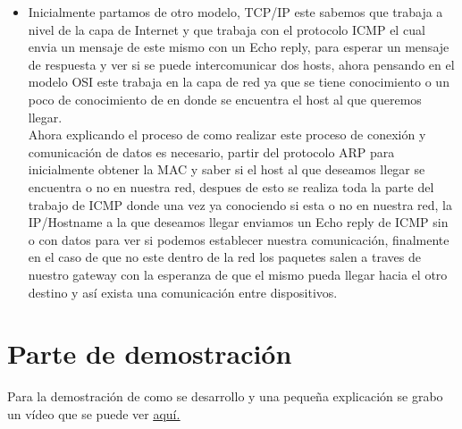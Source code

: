 \documentclass[10pt]{article}
\begin{document}
\begin{itemize}
  \item Inicialmente partamos de otro modelo, TCP/IP este sabemos que trabaja a nivel de la capa de Internet y que trabaja con el protocolo ICMP el cual envia un mensaje de este mismo con un Echo reply, para esperar un mensaje de respuesta y ver si se puede intercomunicar dos hosts, ahora pensando en el modelo OSI este trabaja en la capa de red ya que se tiene conocimiento o un poco de conocimiento de en donde se encuentra el host al que queremos llegar.\\
  Ahora explicando el proceso de como realizar este proceso de conexión y comunicación de datos es necesario, partir del protocolo ARP para inicialmente obtener la MAC y saber si el host al que deseamos llegar se encuentra o no en nuestra red, despues de esto se realiza toda la parte del trabajo de ICMP donde una vez ya conociendo si esta o no en nuestra red, la IP/Hostname a la que deseamos llegar enviamos un Echo reply de ICMP sin o con datos para ver si podemos establecer nuestra comunicación, finalmente en el caso de que no este dentro de la red los paquetes salen a traves de nuestro gateway con la esperanza de que el mismo pueda llegar hacia el otro destino y así exista una comunicación entre dispositivos.
\end{itemize}
\section{Parte de demostración}
Para la demostración de como se desarrollo y una pequeña explicación se grabo un vídeo que se puede ver \underline{\href{https://youtu.be/L1AsCmvMhsc}{aquí.}}
\end{document}
